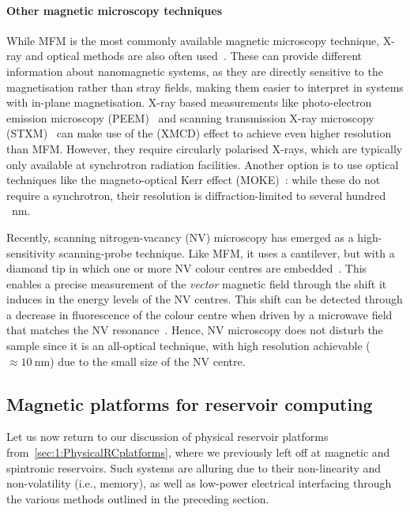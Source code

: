\paragraph{Other magnetic microscopy techniques}
While MFM is the most commonly available magnetic microscopy technique, X-ray and optical methods are also often used~\cite{DynamicEmergence_NanomagneticSystem}.
These can provide different information about nanomagnetic systems, as they are directly sensitive to the magnetisation rather than stray fields, making them easier to interpret in systems with in-plane magnetisation.
X-ray based measurements like photo-electron emission microscopy (PEEM)~\cite{PEEM} and scanning transmission X-ray microscopy (STXM)~\cite{Imaging_MTXM} can make use of the  (XMCD) effect to achieve even higher resolution than MFM.
However, they require circularly polarised X-rays, which are typically only available at synchrotron radiation facilities.
Another option is to use optical techniques like the magneto-optical Kerr effect (MOKE)~\cite{KerrFaraday_book}: while these do not require a synchrotron, their resolution is diffraction-limited to several hundred \SI{}{\nano\metre}. \par
Recently, scanning nitrogen-vacancy (NV) microscopy has emerged as a high-sensitivity scanning-probe technique.
Like MFM, it uses a cantilever, but with a diamond tip in which one or more NV colour centres are embedded~\cite{NVprospects}.
This enables a precise measurement of the \textit{vector} magnetic field through the shift it induces in the energy levels of the NV centres. %
This shift can be detected through a decrease in fluorescence of the colour centre when driven by a microwave field that matches the NV resonance~\cite{NVprinciples_QDM}.
Hence, NV microscopy does not disturb the sample since it is an all-optical technique, with high resolution achievable ($\approx \SI{10}{\nano\metre}$) due to the small size of the NV centre. %

\subsection{Magnetic platforms for reservoir computing}\label{sec:1_RC_magnetic}
Let us now return to our discussion of physical reservoir platforms from~\cref{sec:1:PhysicalRCplatforms}, where we previously left off at magnetic and spintronic reservoirs.
Such systems are alluring due to their non-linearity and non-volatility (i.e., memory), as well as low-power electrical interfacing through the various methods outlined in the preceding section.


